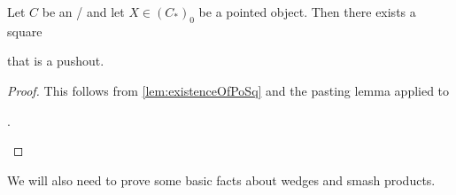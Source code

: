 \begin{corollary}\label{lem:poOfProductIsSuspension}
    Let $C$ be an \inftytop/ and let $X\in \left(C_*\right)_0$ be a pointed object. 
    Then there exists a square
    \begin{center}
    \end{center}
    that is a pushout.
    \begin{proof}
        This follows from \cref{lem:existenceOfPoSq} and the pasting lemma applied to 
        \begin{center}
            \;.
        \end{center}
    \end{proof}
\end{corollary}
We will also need to prove some basic facts about wedges and smash products.
